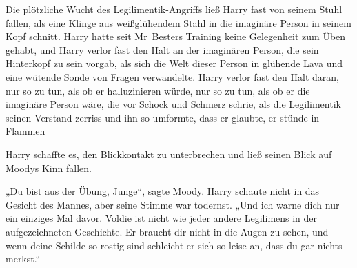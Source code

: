 Die plötzliche Wucht des Legilimentik-Angriffs ließ Harry fast von seinem Stuhl fallen, als eine Klinge aus weißglühendem Stahl in die imaginäre Person in seinem Kopf schnitt. Harry hatte seit Mr~Besters Training keine Gelegenheit zum Üben gehabt, und Harry verlor fast den Halt an der imaginären Person, die sein Hinterkopf zu sein vorgab, als sich die Welt dieser Person in glühende Lava und eine wütende Sonde von Fragen verwandelte. Harry verlor fast den Halt daran, nur so zu tun, als ob er halluzinieren würde, nur so zu tun, als ob er die imaginäre Person wäre, die vor Schock und Schmerz schrie, als die Legilimentik seinen Verstand zerriss und ihn so umformte, dass er glaubte, er stünde in Flammen

Harry schaffte es, den Blickkontakt zu unterbrechen und ließ seinen Blick auf Moodys Kinn fallen.

„Du bist aus der Übung, Junge“, sagte Moody.
Harry schaute nicht in das Gesicht des Mannes, aber seine Stimme war todernst. „Und ich warne dich nur ein einziges Mal davor. Voldie ist nicht wie jeder andere Legilimens in der aufgezeichneten Geschichte. Er braucht dir nicht in die Augen zu sehen, und wenn deine Schilde so rostig sind schleicht er sich so leise an, dass du gar nichts merkst.“


